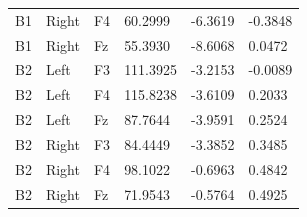 \documentclass[UTF8,a4paper,11pt]{ctexart}
\begin{document}
\begin{longtable}{p{.12\linewidth}p{.12\linewidth}p{.12\linewidth}p{.16\linewidth}p{.16\linewidth}p{.16\linewidth}}
B1 & Right & F4 & 60.2999 & -6.3619 & -0.3848\\

B1 & Right & Fz & 55.3930 & -8.6068 & 0.0472\\

B2 & Left & F3 & 111.3925 & -3.2153 & -0.0089\\

B2 & Left & F4 & 115.8238 & -3.6109 & 0.2033\\

B2 & Left & Fz & 87.7644 & -3.9591 & 0.2524\\

B2 & Right & F3 & 84.4449 & -3.3852 & 0.3485\\

B2 & Right & F4 & 98.1022 & -0.6963 & 0.4842\\

B2 & Right & Fz & 71.9543 & -0.5764 & 0.4925\\

\bottomrule\end{longtable}\normalsize
\end{document}
